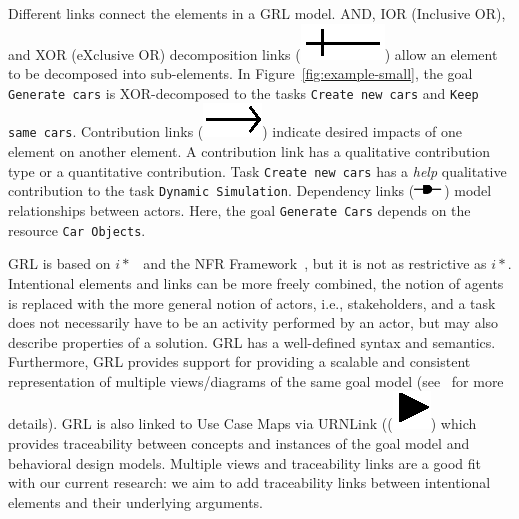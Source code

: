 Different links connect the elements in a GRL model. AND, IOR (Inclusive OR), and XOR (eXclusive OR) decomposition links (\includegraphics[scale=1]{img/decomposition}) allow an element to be decomposed into sub-elements. In Figure~\ref{fig:example-small}, the goal \texttt{Generate cars} is XOR-decomposed to the tasks \texttt{Create new cars} and \texttt{Keep same cars}. Contribution links (\includegraphics[scale=1]{img/contribution}) indicate desired impacts of one element on another element. A contribution link has a qualitative contribution type or a quantitative contribution. Task  \texttt{Create new cars} has a \emph{help} qualitative contribution to the task \texttt{Dynamic Simulation}. Dependency links (\includegraphics[scale=1]{img/dependency}) model relationships between actors. Here, the goal \texttt{Generate Cars} depends on the resource \texttt{Car Objects}. %

GRL is based on $i*$~\cite{Yu:1997:TMR:827255.827807} and the NFR Framework~\cite{chung2012non}, but it is not as restrictive as $i*$. Intentional elements and links can be more freely combined, the notion of agents is replaced with the more general notion of actors, i.e., stakeholders, and a task does not necessarily have to be an activity performed by an actor, but may also describe properties of a solution. GRL has a well-defined syntax and semantics. Furthermore, GRL provides support for providing a scalable and consistent representation of multiple views/diagrams of the same goal model (see~\cite[Ch.2]{Ghanavati2013} for more details). GRL is also linked to Use Case Maps via URNLink ((\includegraphics[scale=1]{img/urnlink}) which provides traceability between concepts and instances of the goal model and behavioral design models. Multiple views and traceability links are a good fit with our current research: we aim to add traceability links between intentional elements and their underlying arguments. 

